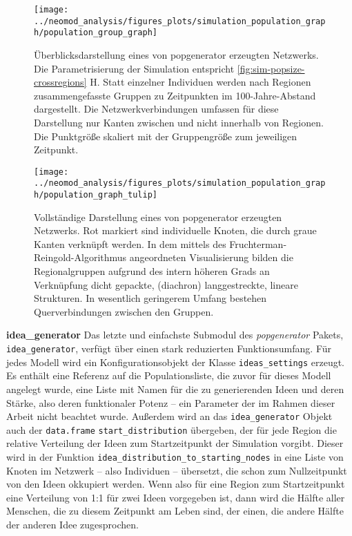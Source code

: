 \documentclass[openany,twoside,twocolumn]{book}
\begin{document}
\begin{landscape}
\begin{figure}[!t]

{\centering \texttt{[image: ../neomod\_analysis/figures\_plots/simulation\_population\_graph/population\_group\_graph]} 

}

\caption[Überblicksdarstellung eines von popgenerator erzeugten Netzwerks]{Überblicksdarstellung eines von popgenerator erzeugten Netzwerks. Die Parametrisierung der Simulation entspricht \ref{fig:sim-popsize-crossregions} H. Statt einzelner Individuen werden nach Regionen zusammengefasste Gruppen zu Zeitpunkten im 100-Jahre-Abstand dargestellt. Die Netzwerkverbindungen umfassen für diese Darstellung nur Kanten zwischen und nicht innerhalb von Regionen. Die Punktgröße skaliert mit der Gruppengröße zum jeweiligen Zeitpunkt.}\label{fig:group-graph}
\end{figure}
\end{landscape}

\begin{figure}[!t]

{\centering \texttt{[image: ../neomod\_analysis/figures\_plots/simulation\_population\_graph/population\_graph\_tulip]} 

}

\caption[Vollständige Darstellung eines von popgenerator erzeugten Netzwerks]{Vollständige Darstellung eines von popgenerator erzeugten Netzwerks. Rot markiert sind individuelle Knoten, die durch graue Kanten verknüpft werden. In dem mittels des Fruchterman-Reingold-Algorithmus angeordneten Visualisierung bilden die Regionalgruppen aufgrund des intern höheren Grads an Verknüpfung dicht gepackte, (diachron) langgestreckte, lineare Strukturen. In wesentlich geringerem Umfang bestehen Querverbindungen zwischen den Gruppen.}\label{fig:graph-tulip}
\end{figure}

\textbf{idea\_generator} \newline 
Das letzte und einfachste Submodul des \emph{popgenerator} Pakets, \texttt{idea\_generator}, verfügt über einen stark reduzierten Funktionsumfang. Für jedes Modell wird ein Konfigurationsobjekt der Klasse \texttt{ideas\_settings} erzeugt. Es enthält eine Referenz auf die Populationsliste, die zuvor für dieses Modell angelegt wurde, eine Liste mit Namen für die zu generierenden Ideen und deren Stärke, also deren funktionaler Potenz -- ein Parameter der im Rahmen dieser Arbeit nicht beachtet wurde. Außerdem wird an das \texttt{idea\_generator} Objekt auch der \texttt{data.frame} \texttt{start\_distribution} übergeben, der für jede Region die relative Verteilung der Ideen zum Startzeitpunkt der Simulation vorgibt. Dieser wird in der Funktion \texttt{idea\_distribution\_to\_starting\_nodes} in eine Liste von Knoten im Netzwerk -- also Individuen -- übersetzt, die schon zum Nullzeitpunkt von den Ideen okkupiert werden. Wenn also für eine Region zum Startzeitpunkt eine Verteilung von 1:1 für zwei Ideen vorgegeben ist, dann wird die Hälfte aller Menschen, die zu diesem Zeitpunkt am Leben sind, der einen, die andere Hälfte der anderen Idee zugesprochen.
\end{document}
